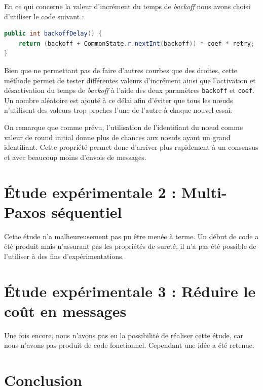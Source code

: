 \documentclass[french]{article}
\begin{document}
En ce qui concerne la valeur d'incrément du temps de \emph{backoff} nous avons choisi d'utiliser le code suivant :

\begin{lstlisting}[language=java]
public int backoffDelay() {
	return (backoff + CommonState.r.nextInt(backoff)) * coef * retry;
}
\end{lstlisting}

Bien que ne permettant pas de faire d'autres courbes que des droites, cette méthode permet de tester différentes valeurs d'incrément ainsi que l'activation et désactivation du temps de \emph{backoff} à l'aide des deux paramètres \lstinline{backoff} et \lstinline{coef}.
Un nombre aléatoire est ajouté à ce délai afin d'éviter que tous les nœuds n'utilisent des valeurs trop proches l'une de l'autre à chaque nouvel essai.



On remarque que comme prévu, l'utilisation de l'identifiant du nœud comme valeur de round initial donne plus de chances aux nœuds ayant un grand identifiant.
Cette propriété permet donc d'arriver plus rapidement à un consensus et avec beaucoup moins d'envois de messages.





\section{Étude expérimentale 2 : Multi-Paxos séquentiel}

Cette étude n'a malheureusement pas pu être menée à terme.
Un début de code a été produit mais n'assurant pas les propriétés de sureté, il n'a pas été possible de l'utiliser à des fins d'expérimentations.

\section{Étude expérimentale 3 : Réduire le coût en messages}

Une fois encore, nous n'avons pas eu la possibilité de réaliser cette étude, car nous n'avons pas produit de code fonctionnel.
Cependant une idée a été retenue.

\section*{Conclusion}
\end{document}
